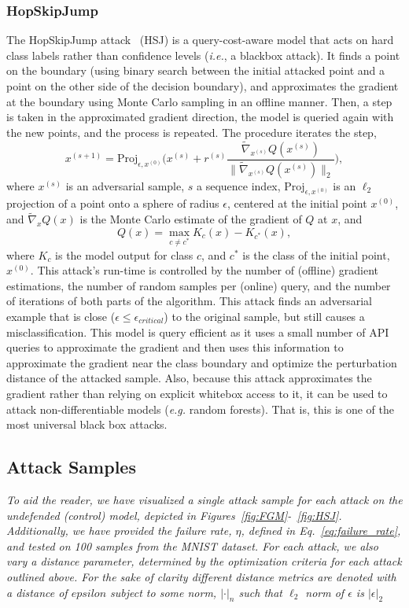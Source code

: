 \documentclass[journal]{IEEEtran}
\newcommand{\ie}{\textit{i.e.}\xspace}
\newcommand{\eg}{\textit{e.g.}\xspace}
\newcommand{\cm}[1]{\textit{{\color{blue}#1}}}
\begin{document}
\subsubsection{HopSkipJump}

The HopSkipJump attack~\cite{hopskipjump} (HSJ) is a query-cost-aware model that acts on hard class labels rather than confidence levels (\ie, a blackbox attack). It finds a point on the boundary (using binary search between the initial attacked point and a point on the other side of the decision boundary), and approximates the gradient at the boundary using Monte Carlo sampling in an offline manner. Then, a step is taken in the approximated gradient direction, the model is queried again with the new points, and the process is repeated. The procedure iterates the step,
$$
   x^{(s+1)} = \mathrm{Proj}_{\epsilon,x^{(0)}}\Bigg( x^{(s)} + r^{(s)} \frac{\widetilde{\nabla}_{x^{(s)}}  Q(x^{(s)}) }{\big\|\widetilde{\nabla}_{x^{(s)}} Q(x^{(s)}) \big\|_2}\Bigg),
$$
where $x^{(s)}$ is an adversarial sample, $s$ a sequence index, $\mathrm{Proj}_{\epsilon,x^{(0)}}$ is an $\ell_2$ projection of a point onto a sphere of radius $\epsilon$, centered at the initial point $x^{(0)}$, and $\widetilde{\nabla}_xQ(x)$ is the Monte Carlo estimate of the gradient of $Q$ at $x$, and
$$
    Q(x) = \max_{c\neq c^*} K_c(x) - K_{c^*}(x),
$$
where $K_{c}$ is the model output for class $c$, and $c^*$ is the class of the initial point, $x^{(0)}$. This attack's run-time is controlled by the number of (offline) gradient estimations, the number of random samples per (online) query, and the number of iterations of both parts of the algorithm. This attack finds an adversarial example that is close ($\epsilon \leq \epsilon_{critical}$) to the original sample, but still causes a misclassification.  This model is query efficient as it uses a small number of API queries to approximate the gradient and then uses this information to approximate the gradient near the class boundary and optimize the perturbation distance of the attacked sample. Also, because this attack approximates the gradient rather than relying on explicit whitebox access to it, it can be used to attack non-differentiable models (\eg random forests). That is, this is one of the most universal black box attacks.

\subsection{Attack Samples}
\cm{
To aid the reader, we have visualized a single attack sample for each attack on the undefended (control) model, depicted in Figures~\ref{fig:FGM}-~\ref{fig:HSJ}. Additionally, we have provided the failure rate, $\eta$, defined in Eq.~\ref{eq:failure_rate}, and tested on 100 samples from the MNIST dataset. For each attack, we also vary a distance parameter, determined by the optimization criteria for each attack outlined above. For the sake of clarity different distance metrics are denoted with a distance of $epsilon$ subject to some norm, $| \cdot |_n$ such that $\ell_2$ norm of ${\epsilon}$ is $ | \epsilon |_2$
}
\end{document}
